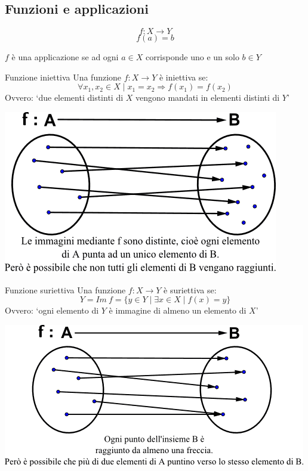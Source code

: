 \documentclass[a4paper]{article}
\theoremstyle{definition}
\begin{document}
\subsection{Funzioni e applicazioni}
\[ f: X \rightarrow Y \]
\[ f(a) = b \]

$f$ è una applicazione se ad ogni $a \in X$ corrisponde uno e un solo $b \in Y$

\begin{deff}{Funzione iniettiva}{}
	Una funzione $f: X \rightarrow Y$ è iniettiva se:
	\[ \forall x_1, x_2 \in X \mid x_1 = x_2 \Rightarrow f(x_1) = f(x_2) \]
	Ovvero: \enquote*{due elementi distinti di $X$ vengono mandati in elementi distinti di $Y$}
	\begin{center}
		\includegraphics{images/iniettiva.png}
	\end{center}
\end{deff}
\begin{deff}{Funzione suriettiva}{}
	Una funzione $f: X \rightarrow Y$ è suriettiva se:
	\[
		Y = Im \ f = \{y \in Y \mid \exists x \in X \mid f(x) = y\}
	\]
	Ovvero: \enquote*{ogni elemento di $Y$ è immagine di almeno un elemento di $X$}
	\begin{center}
		\includegraphics{images/suriettiva.png}
	\end{center}
\end{deff}
\end{document}
